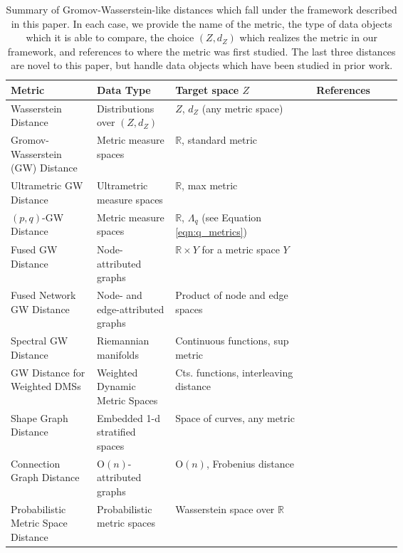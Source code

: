 \documentclass[twoside,11pt]{article}
\theoremstyle{definition}
\begin{document}
\begin{table}[t]
\centering
\small
\setlength{\tabcolsep}{3pt}
\renewcommand{\arraystretch}{1.0}

\begin{tabularx}{\linewidth}{@{}
  >{\raggedright\arraybackslash}p{0.22\linewidth}
  >{\raggedright\arraybackslash}p{0.20\linewidth}
  >{\raggedright\arraybackslash}X
  >{\raggedright\arraybackslash}p{0.22\linewidth}
@{}}
\toprule
Metric & Data Type & Target space $Z$ & References\\
\midrule
Wasserstein Distance & Distributions over $(Z,d_Z)$ & $Z$, $d_Z$ (any metric space) & \citet{villani2003topics} \\
Gromov-Wasserstein (GW) Distance & Metric measure spaces & $\mathbb{R}$, standard metric & \citet{memoli2007,memoli2011,chowdhury2019gromov} \\
Ultrametric GW Distance & Ultrametric measure spaces & $\mathbb{R}$, max metric & \citet{memoli2021ultrametric} \\
$(p,q)$-GW Distance & Metric measure spaces & $\mathbb{R}$, $\Lambda_q$ (see Equation \ref{eqn:q_metrics}) & \citet{arya2023gromov} \\
Fused GW Distance & Node-attributed graphs & $\mathbb{R} \times Y$ for a metric space $Y$ & \citet{titouan2019optimal,vayer2020fused} \\
Fused Network GW Distance & Node- and edge-attributed graphs & Product of node and edge spaces & \citet{yang2023exploiting,kawano2024multi} \\
Spectral GW Distance & Riemannian manifolds & Continuous functions, sup metric & \citet{memoli2009spectral} \\
GW Distance for Weighted DMSs & Weighted Dynamic Metric Spaces & Cts. functions, interleaving distance & \citet{woojin-thesis} \\
\addlinespace
\midrule
Shape Graph Distance & Embedded 1-d stratified spaces & Space of curves, any metric & \citet{sukurdeep2022new,srivastava2020advances,bal2024statistical} \\ 
Connection Graph Distance & $\mathrm{O}(n)$-attributed graphs & $\mathrm{O}(n)$,  Frobenius distance & \citet{bhamre2015orthogonal,singer2011angular,robertson2023generalization} \\
Probabilistic Metric Space Distance & Probabilistic metric spaces & Wasserstein space over $\mathbb{R}$ & \citet{menger1942statistical,wald1943statistical,kramosil1975fuzzy} \\
\bottomrule
\end{tabularx}
\caption{Summary of Gromov-Wasserstein-like distances which fall under the framework described in this paper. In each case, we provide the name of the metric, the type of data objects which it is able to compare, the choice $(Z,d_Z)$ which realizes the metric in our framework, and references to where the metric was first studied. The last three distances are novel to this paper, but handle data objects which have been studied in prior work.}
\label{tab:metrics}
\end{table}
\end{document}
